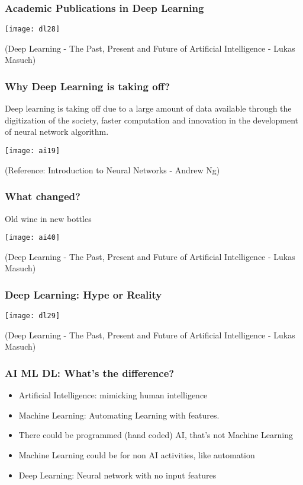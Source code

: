 \begin{frame}[fragile]\frametitle{Academic Publications in Deep Learning}
\begin{center}
\texttt{[image: dl28]}
\end{center}
{\tiny (Deep Learning - The Past, Present and Future of Artificial Intelligence - Lukas Masuch)}
\end{frame}
\begin{frame}[fragile] \frametitle{Why Deep Learning is taking off?}
Deep learning is taking off due to a large amount of data available through the digitization of the society, 
faster computation and innovation in the development of neural network algorithm. 

\begin{center}
\texttt{[image: ai19]}
\end{center}


\tiny{(Reference: Introduction to Neural Networks - Andrew Ng)}

\end{frame}

\begin{frame}[fragile]\frametitle{What changed?}
Old wine in new bottles
\begin{center}
\texttt{[image: ai40]}
\end{center}
{\tiny (Deep Learning - The Past, Present and Future of Artificial Intelligence - Lukas Masuch)}
\end{frame}



\begin{frame}[fragile]\frametitle{Deep Learning: Hype or Reality}
\begin{center}
\texttt{[image: dl29]}
\end{center}
{\tiny (Deep Learning - The Past, Present and Future of Artificial Intelligence - Lukas Masuch)}
\end{frame}


\begin{frame}[fragile] \frametitle{AI ML DL: What's the difference?}

\begin{itemize}
\item Artificial Intelligence: mimicking human intelligence
\item Machine Learning: Automating Learning with features. 
\item There could be programmed (hand coded) AI, that's not Machine Learning
\item Machine Learning could be for non AI activities, like automation
\item Deep Learning: Neural network with no input features
\end{itemize}
\end{frame}

